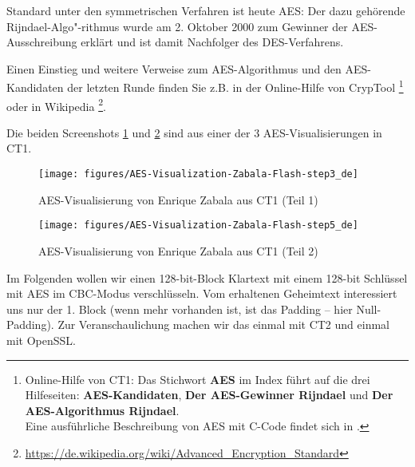 Standard unter den symmetrischen Verfahren ist heute AES:
Der dazu gehörende Rijndael-Algo"-rithmus wurde am 2. Oktober 2000 zum
Gewinner der AES-Ausschreibung erklärt und ist damit Nachfolger
des DES-Verfahrens.

Einen Einstieg und weitere Verweise zum AES-Algorithmus und den AES-Kandidaten
der letzten Runde finden Sie z.B. in der Online-Hilfe von
CrypTool%
\footnote{%
      Online-Hilfe von CT1: Das Stichwort {\bfseries AES} im Index
      führt auf die drei Hilfeseiten: {\bfseries AES-Kandidaten}, 
      {\bfseries Der AES-Gewinner Rijndael} und {\bfseries Der AES-Algorithmus Rijndael}.\\
      Eine ausführliche Beschreibung von AES mit C-Code findet sich
      in \cite{Haan2008}.
  }
oder in Wikipedia%
\footnote{%
	\url{https://de.wikipedia.org/wiki/Advanced_Encryption_Standard}
  }.


\clearpage
\noindent Die beiden Screenshots \ref{AES-Visualization-Zabala-Flash-step3} und
\ref{AES-Visualization-Zabala-Flash-step5} sind aus einer der 3
AES-Visualisierungen in CT1.

\begin{figure}[!ht]
\begin{center}
\texttt{[image: figures/AES-Visualization-Zabala-Flash-step3\_de]}
\caption{AES-Visualisierung von Enrique Zabala aus CT1 (Teil 1)}
\label{AES-Visualization-Zabala-Flash-step3}
\end{center}
\end{figure}

\begin{figure}[!ht]
\begin{center}
\texttt{[image: figures/AES-Visualization-Zabala-Flash-step5\_de]}
\caption{AES-Visualisierung von Enrique Zabala aus CT1 (Teil 2)}
\label{AES-Visualization-Zabala-Flash-step5}
\end{center}
\end{figure}


\clearpage
\noindent Im Folgenden wollen wir einen 128-bit-Block Klartext mit einem 128-bit
Schlüssel mit AES im CBC-Modus verschlüsseln. Vom erhaltenen Geheimtext interessiert
uns nur der 1. Block (wenn mehr vorhanden ist, ist das Padding -- hier Null-Padding).
Zur Veranschaulichung machen wir das einmal mit CT2 und einmal mit OpenSSL.\\

